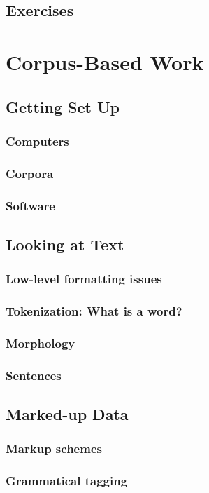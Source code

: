 \documentclass[a4paper]{article}
\begin{document}
\subsection{Exercises}
\newpage
\section{Corpus-Based Work}
\subsection{Getting Set Up}
\subsubsection{Computers}
\subsubsection{Corpora}
\subsubsection{Software}
\subsection{Looking at Text}
\subsubsection{Low-level formatting issues}
\subsubsection{Tokenization: What is a word?}
\subsubsection{Morphology}
\subsubsection{Sentences}
\subsection{Marked-up Data}
\subsubsection{Markup schemes}
\subsubsection{Grammatical tagging}
\end{document}
